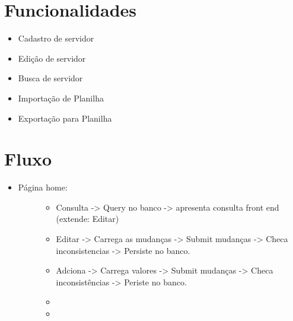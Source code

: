 \documentclass[letterpaper,10pt,openany,oneside,portuges]{sphinxmanual}
\begin{document}
\chapter{Funcionalidades}
\label{\detokenize{funcionalidades:funcionalidades}}\label{\detokenize{funcionalidades::doc}}\begin{itemize}
\item {} 
Cadastro de servidor

\item {} 
Edição de servidor

\item {} 
Busca de servidor

\item {} 
Importação de Planilha

\item {} 
Exportação para Planilha

\end{itemize}


\chapter{Fluxo}
\label{\detokenize{fluxo::doc}}\label{\detokenize{fluxo:fluxo}}\begin{itemize}
\item {} \begin{description}
\item[{Página home:}] \leavevmode\begin{itemize}
\item {} 
Consulta -\textgreater{} Query no banco -\textgreater{} apresenta consulta front end (extende: Editar)

\item {} 
Editar -\textgreater{} Carrega as mudanças -\textgreater{} Submit mudanças -\textgreater{} Checa inconsistencias -\textgreater{} Persiste no banco.

\item {} 
Adciona -\textgreater{} Carrega valores -\textgreater{} Submit mudanças -\textgreater{} Checa inconsistências -\textgreater{} Periste no banco.

\item {} 

\item {} 

\end{itemize}

\end{description}

\end{itemize}



\renewcommand{\indexname}{Índice}
\printindex
\end{document}
